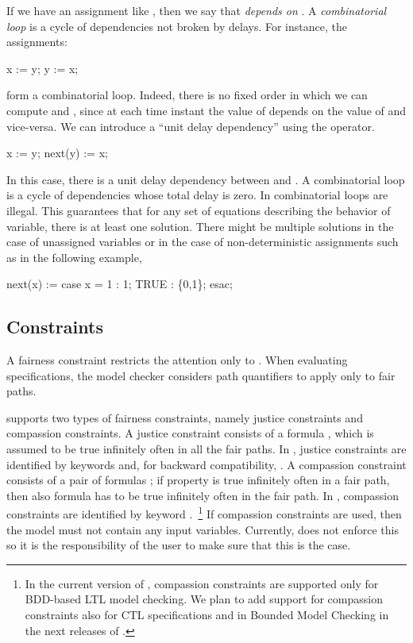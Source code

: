 If we have an assignment like  \reserved{:=} 
\reserved{;}, then we say that  \emph{depends on} . A
\emph{combinatorial loop} is a cycle of dependencies not broken by
delays. For instance, the assignments:
%
\begin{nusmvCode}
x := y;
y := x;
\end{nusmvCode}
%
form a combinatorial loop. Indeed, there is no fixed order in which we
can compute  and , since at each time instant the
value of  depends on the value of  and vice-versa. We
can introduce a ``unit delay dependency'' using the 
operator.
%
\begin{nusmvCode}
      x := y;
next(y) := x;
\end{nusmvCode}
%
In this case, there is a unit delay dependency between  and
.
%
A combinatorial loop is a cycle of dependencies whose total delay is
zero. In \nusmv combinatorial loops are illegal. This guarantees that
for any set of equations describing the behavior of variable, there is
at least one solution. There might be multiple solutions in the case
of unassigned variables or in the case of non-deterministic
assignments such as in the following example,
%
\begin{nusmvCode}
    next(x) := case x = 1 : 1;
                    TRUE  : \{0,1\};
               esac;
\end{nusmvCode}



\subsection{ Constraints}
\label{FAIRNESS Constraints}
%
A fairness constraint restricts the attention only to . When evaluating specifications, the model checker
considers path quantifiers to apply only to fair paths.

\nusmv supports two types of fairness constraints, namely justice
constraints and compassion constraints.
%
A justice constraint consists of a formula , which is assumed
to be true infinitely often in all the fair paths.
%
In \nusmv, justice constraints are identified by
keywords  and, for backward compatibility,
.
%
A compassion constraint consists of a pair of formulas ;
if property  is true infinitely often in a fair path, then
also formula  has to be true infinitely often in the fair
path.
%
In \nusmv, compassion constraints are identified by keyword
.~\footnote{In the current version of \nusmv,
compassion constraints are supported only for BDD-based LTL model
checking. We plan to add support for compassion constraints also for
CTL specifications and in Bounded Model Checking in the next releases
of \nusmv.}
%
If compassion constraints are used, then the model must not contain any
input variables.
%
Currently, \nusmv does not enforce this so it is the responsibility of
the user to make sure that this is the case.

